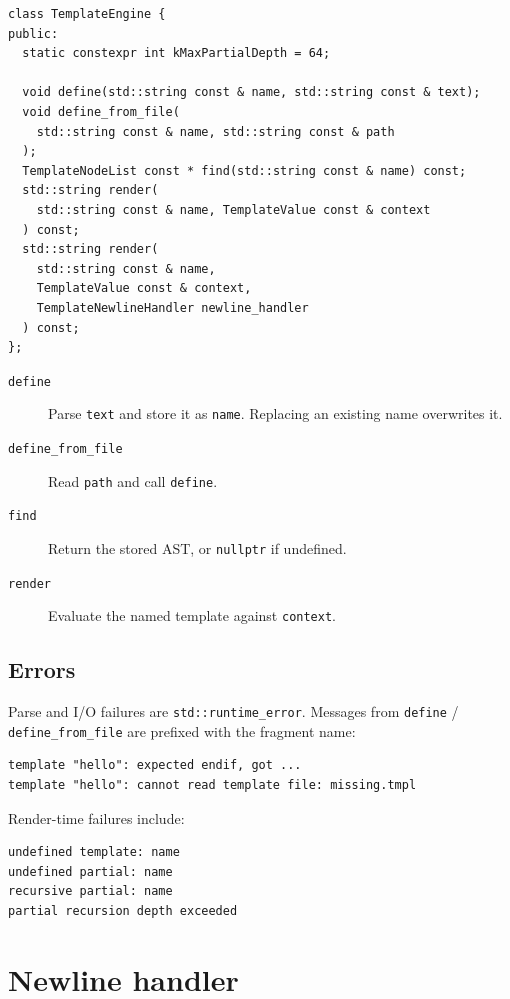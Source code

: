 \documentclass[11pt,letterpaper]{article}
\newcommand{\api}[1]{\texttt{#1}}
\begin{document}
\begin{lstlisting}
class TemplateEngine {
public:
  static constexpr int kMaxPartialDepth = 64;

  void define(std::string const & name, std::string const & text);
  void define_from_file(
    std::string const & name, std::string const & path
  );
  TemplateNodeList const * find(std::string const & name) const;
  std::string render(
    std::string const & name, TemplateValue const & context
  ) const;
  std::string render(
    std::string const & name,
    TemplateValue const & context,
    TemplateNewlineHandler newline_handler
  ) const;
};
\end{lstlisting}

\begin{description}
  \item[\api{define}] Parse \texttt{text} and store it as \texttt{name}.
        Replacing an existing name overwrites it.
  \item[\api{define\_from\_file}] Read \texttt{path} and call \api{define}.
  \item[\api{find}] Return the stored AST, or \texttt{nullptr} if undefined.
  \item[\api{render}] Evaluate the named template against \texttt{context}.
\end{description}

\subsection{Errors}

Parse and I/O failures are \api{std::runtime\_error}. Messages from
\api{define} / \api{define\_from\_file} are prefixed with the fragment name:

\begin{lstlisting}[style=tmpl]
template "hello": expected endif, got ...
template "hello": cannot read template file: missing.tmpl
\end{lstlisting}

Render-time failures include:

\begin{lstlisting}[style=tmpl]
undefined template: name
undefined partial: name
recursive partial: name
partial recursion depth exceeded
\end{lstlisting}

\section{Newline handler}
\label{sec:newlines}
\end{document}
